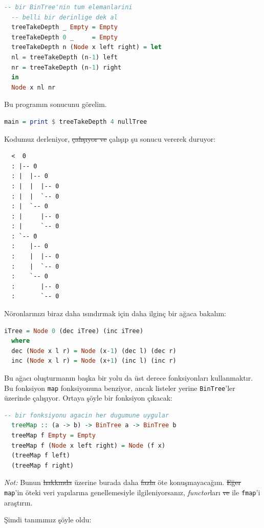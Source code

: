 \documentclass[a4paper,14pt,openany]{extbook} %
\let\emph\textit
\begin{document}
\begin{lstlisting}[language=Haskell]
  -- bir BinTree'nin tum elemanlarini
  -- belli bir derinlige dek al
  treeTakeDepth _ Empty = Empty
  treeTakeDepth 0 _     = Empty
  treeTakeDepth n (Node x left right) = let
  nl = treeTakeDepth (n-1) left
  nr = treeTakeDepth (n-1) right
  in
  Node x nl nr
\end{lstlisting}

Bu programın sonucunu görelim.

\begin{lstlisting}[language=Haskell]
  main = print $ treeTakeDepth 4 nullTree
\end{lstlisting}

Kodumuz derleniyor, \st{çalışıyor ve} çalışıp şu sonucu vererek duruyor:

\begin{lstlisting}
  <  0
  : |-- 0
  : |  |-- 0
  : |  |  |-- 0
  : |  |  `-- 0
  : |  `-- 0
  : |     |-- 0
  : |     `-- 0
  : `-- 0
  :    |-- 0
  :    |  |-- 0
  :    |  `-- 0
  :    `-- 0
  :       |-- 0
  :       `-- 0
\end{lstlisting}

Nöronlarınızı biraz daha ısındırmak için daha ilginç bir ağaca bakalım:

\begin{lstlisting}[language=Haskell]
  iTree = Node 0 (dec iTree) (inc iTree)
  where
  dec (Node x l r) = Node (x-1) (dec l) (dec r)
  inc (Node x l r) = Node (x+1) (inc l) (inc r)
\end{lstlisting}

Bu ağacı oluşturmanın başka bir yolu da üst derece fonksiyonları
kullanmaktır. Bu fonksiyon \lstinline!map! fonksiyonuna benziyor, ancak
listeler yerine \lstinline!BinTree!'ler üzerinde çalışıyor. Ortaya şöyle
bir fonksiyon çıkacak:

\begin{lstlisting}[language=Haskell]
  -- bir fonksiyonu agacin her dugumune uygular
  treeMap :: (a -> b) -> BinTree a -> BinTree b
  treeMap f Empty = Empty
  treeMap f (Node x left right) = Node (f x)
  (treeMap f left)
  (treeMap f right)
\end{lstlisting}

\emph{Not:} Bunun \st{hakkında} üzerine burada daha \st{fazla} öte konuşmayacağım.
\st{Eğer} \lstinline!map!'in öteki veri yapılarına genellemesiyle
ilgileniyorsanız, \emph{functor}ları \st{ve} ile \lstinline!fmap!'i araştırın.

Şimdi tanımımız şöyle oldu:
\end{document}
